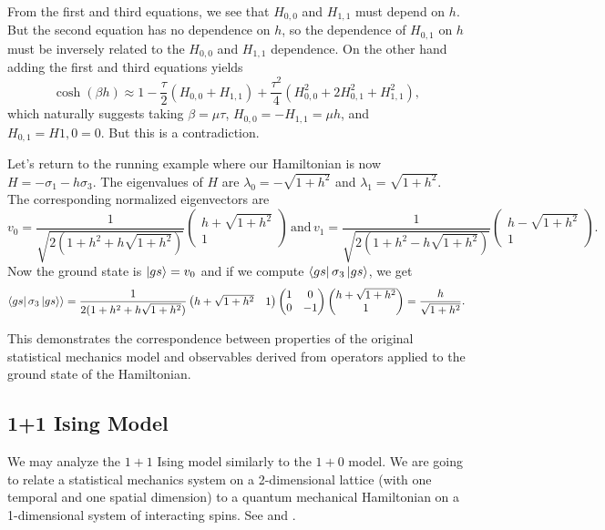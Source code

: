 \documentclass[11pt,reqno]{amsart}
\begin{document}
	From the first and third equations, we see that $H_{0,0}$ and $H_{1,1}$ must depend on $h$. 
	But the second equation has no dependence on $h$, so the dependence of $H_{0,1}$ on $h$ must be inversely related to the $H_{0,0}$ and $H_{1,1}$ dependence.
	On the other hand adding the first and third equations yields
	\[\cosh(\beta h) \approx 1-\frac{\tau}{2}( H_{0,0}+ H_{1,1})+\frac{\tau^2}{4}(H_{0,0}^2+2H_{0,1}^2+H_{1,1}^2), \]
	which naturally suggests  taking $\beta=\mu\tau$, $H_{0,0}=-H_{1,1}=\mu h$, and $H_{0,1}=H{1,0}=0$. But this is a contradiction.
	
	Let's return to the running example where our Hamiltonian is now $H=-\sigma_1-h\sigma_3$.
	The eigenvalues of $H$ are $\lambda_0=-\sqrt{1+h^2}$ and $\lambda_1=\sqrt{1+h^2}$.
	The corresponding normalized eigenvectors are
		\[v_0= \frac{1}{\sqrt{2(1+h^2+h\sqrt{1+h^2})}}\begin{pmatrix}
		h+\sqrt{1+h^2} \\ 1
		\end{pmatrix} \, \text{and} \, v_1= \frac{1}{\sqrt{2(1+h^2-h\sqrt{1+h^2})}}\begin{pmatrix}
		h-\sqrt{1+h^2} \\ 1
		\end{pmatrix}. \]
	Now the ground state is $\ket{gs}=v_0$ and if we compute $\bra{gs} \sigma_3 \ket{gs}$, we get
		\[\bra{gs} \sigma_3 \ket{gs} \rangle=\frac{1}{2(1+h^2+h\sqrt{1+h^2})}\begin{pmatrix}
		h+\sqrt{1+h^2} & 1
		\end{pmatrix}
		\begin{pmatrix}
		1 & 0 \\
		0 & -1
		\end{pmatrix}
		\begin{pmatrix}
		h+\sqrt{1+h^2} \\ 1
		\end{pmatrix}=\frac{h}{\sqrt{1+h^2}} .\]
	
	This demonstrates the correspondence between properties of the original statistical mechanics model and observables derived from operators applied to the ground state of the Hamiltonian.
	
	\subsection{1+1 Ising Model}
	
	We may analyze the $1+1$ Ising model similarly to the $1+0$ model. 
	We are going to relate a statistical mechanics system on a 2-dimensional lattice (with one temporal and one spatial dimension) to a quantum mechanical Hamiltonian on a 1-dimensional system of interacting spins.  
	See \cite{FradkinSusskind78} and \cite{KogutGaugeSummary}.
	
\end{document}
